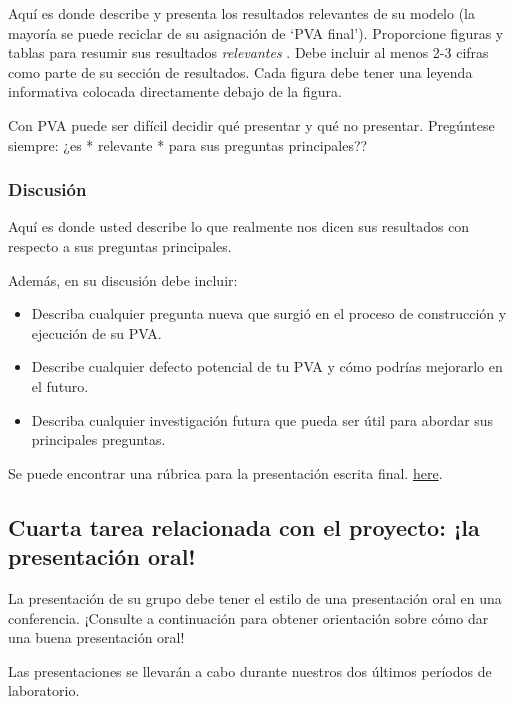 \documentclass[
]{article}
\providecommand{\tightlist}{%
  \setlength{\itemsep}{0pt}\setlength{\parskip}{0pt}}
\begin{document}
Aquí es donde describe y presenta los resultados relevantes de su modelo
(la mayoría se puede reciclar de su asignación de `PVA final').
Proporcione figuras y tablas para resumir sus resultados
\emph{relevantes }. Debe incluir al menos 2-3 cifras como parte de su
sección de resultados. Cada figura debe tener una leyenda informativa
colocada directamente debajo de la figura.

Con PVA puede ser difícil decidir qué presentar y qué no presentar.
Pregúntese siempre: ¿es * relevante * para sus preguntas principales??

\hypertarget{discusiuxf3n}{%
\subsubsection{Discusión}\label{discusiuxf3n}}

Aquí es donde usted describe lo que realmente nos dicen sus resultados
con respecto a sus preguntas principales.

Además, en su discusión debe incluir:

\begin{itemize}
\tightlist
\item
  Describa cualquier pregunta nueva que surgió en el proceso de
  construcción y ejecución de su PVA.
\item
  Describe cualquier defecto potencial de tu PVA y cómo podrías
  mejorarlo en el futuro.
\item
  Describa cualquier investigación futura que pueda ser útil para
  abordar sus principales preguntas.
\end{itemize}

Se puede encontrar una rúbrica para la presentación escrita final.
\href{WrittenProject_rubric.docx}{here}.

\hypertarget{cuarta-tarea-relacionada-con-el-proyecto-la-presentaciuxf3n-oral}{%
\subsection{Cuarta tarea relacionada con el proyecto: ¡la presentación
oral!}\label{cuarta-tarea-relacionada-con-el-proyecto-la-presentaciuxf3n-oral}}

La presentación de su grupo debe tener el estilo de una presentación
oral en una conferencia. ¡Consulte a continuación para obtener
orientación sobre cómo dar una buena presentación oral!

Las presentaciones se llevarán a cabo durante nuestros dos últimos
períodos de laboratorio.
\end{document}
